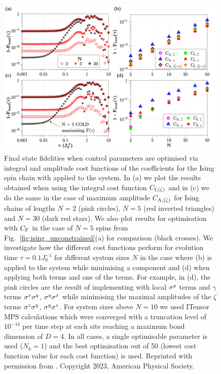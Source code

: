 \begin{figure}[t!]
    \centering
    \includegraphics[width=\linewidth]{images/ising_max_int_plots.png} \caption[Plot of final state fidelity for the Ising spin chain for different cost functions with LCD applied.]{Final state fidelities when control parameters are optimised via integral and amplitude cost functions of the   coefficients for the Ising spin chain with   applied to the system. In (a) we plot the results obtained when using the integral cost function $C_{\rm I, (\zeta)}$ and in (c) we do the same in the case of maximum amplitude $C_{\rm A, (\zeta)}$ for Ising chains of lengths $N = 2$ (pink circles), $N = 5$ (red inverted triangles) and $N=30$ (dark red stars). We also plot results for  optimisation with $C_{\rm F}$ in the case of $N=5$ spins from Fig.~\ref{fig:ising_unconstrained}(a) for comparison (black crosses). We investigate how the different cost functions perform for evolution time $\tau = 0.1J_0^{-1}$ for different system sizes $N$ in the case where (b)   is applied to the system while minimising a  component and (d) when applying both  terms and one of the  terms. For example, in (d), the pink circles are the result of implementing  with  local $\sigma^y$ terms and $\gamma$ terms $\sigma^x\sigma^y$, $\sigma^y\sigma^x$ while minimising the maximal amplitudes of the $\zeta$ terms $\sigma^z\sigma^y$, $\sigma^y\sigma^z$. For system sizes above $N=10$ we used ITensor\cite{fishman_itensor_2022} MPS calculations which were converged with a truncation level of $10^{-14}$ per time step at each site reaching a maximum bond dimension of $D = 4$. In all cases, a single optimisable parameter is used ($N_k = 1$) and the best optimisation out of 50 (lowest cost function value for each cost function) is used. Reprinted with permission from \cite{cepaite_counterdiabatic_2023}. Copyright 2023, American Physical Society.}\label{fig:ising_minimising_ho_mainplot}
\end{figure}

